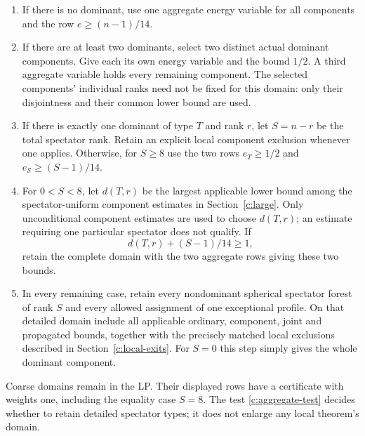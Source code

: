 \begin{enumerate}[label=\textup{\arabic*.},leftmargin=*]
\item If there is no dominant, use one aggregate energy variable for all
 components and the row $e\ge(n-1)/14$.
\item If there are at least two dominants, select two distinct actual
 dominant components. Give each its own energy variable and the bound
 $1/2$. A third aggregate variable holds every remaining component.
 The selected components' individual ranks need not be fixed for this
 domain: only their disjointness and their common lower bound are used.
\item If there is exactly one dominant of type $T$ and rank $r$, let
 $S=n-r$ be the total spectator rank. Retain an explicit local
 component exclusion whenever one applies. Otherwise, for $S\ge8$ use
 the two rows $e_T\ge1/2$ and $e_{\mathcal S}\ge(S-1)/14$.
\item For $0<S<8$, let $d(T,r)$ be the largest applicable lower bound
 among the spectator-uniform component estimates in
 Section~\ref{c:large}. Only unconditional component estimates are used
 to choose $d(T,r)$; an estimate requiring one particular spectator
 does not qualify. If
 \begin{equation}\label{c:aggregate-test}
                  d(T,r)+(S-1)/14\ge1,
 \end{equation}
 retain the complete domain with the two aggregate rows giving these
 two bounds.
\item In every remaining case, retain every nondominant spherical
 spectator forest of rank $S$ and every allowed assignment of one
 exceptional profile. On that detailed domain include all applicable
 ordinary, component, joint and propagated bounds, together with the
 precisely matched local exclusions described in Section~\ref{c:local-exits}.
 For $S=0$ this step simply gives the whole dominant component.
\end{enumerate}

Coarse domains remain in the LP. Their displayed rows have a certificate
with weights one, including the equality case $S=8$. The test
\eqref{c:aggregate-test} decides whether to retain detailed spectator
types; it does not enlarge any local theorem's domain.

